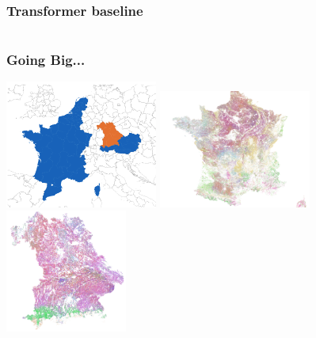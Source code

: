 \begin{frame}
\frametitle{Transformer baseline}



\begin{columns}
	
	
	
\end{columns}

\end{frame}


\begin{frame}
\frametitle{Going Big...}

\includegraphics[width=5cm]{images/EuroCrops}
\includegraphics[width=5cm]{images/France}
\includegraphics[width=4cm]{images/Bavaria}

\end{frame}


